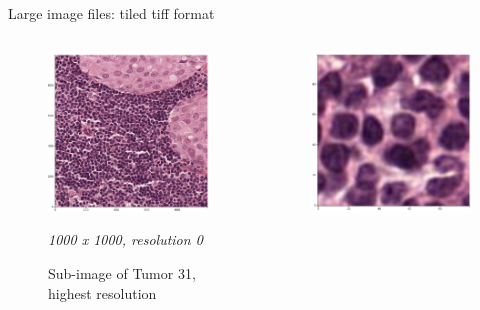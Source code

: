 \documentclass{beamer}
\begin{document}
\begin{frame}{Large image files: tiled tiff format}
\begin{columns}[T]
\begin{column}{.3\textwidth}
\begin{figure}[!ht]
\includegraphics[width=\textwidth]{Tumor_31_res0.png}
\caption{Sub-image of Tumor 31, highest resolution}
\textit{1000 x 1000, resolution 0}
\label{}
\end{figure}
\end{column}%
\hfill%
\begin{column}{.3\textwidth}
\begin{figure}[!ht]
\centering
\includegraphics[width=\textwidth]{Tumor_31_res0_zoom.png}

\end{figure}
\end{column}
\end{columns}
\end{frame}
\end{document}
